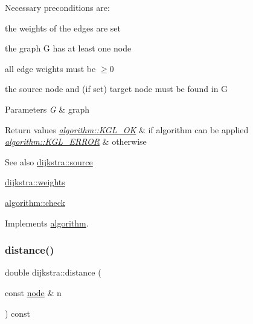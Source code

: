 Necessary preconditions are\+:
\begin{DoxyItemize}
\item the weights of the edges are set
\item the graph {\ttfamily G} has at least one node
\item all edge weights must be $\ge 0$
\item the source node and (if set) target node must be found in {\ttfamily G} 
\end{DoxyItemize}


\begin{DoxyParams}{Parameters}
{\em G} & graph\\
\hline
\end{DoxyParams}

\begin{DoxyRetVals}{Return values}
{\em \mbox{\hyperlink{classalgorithm_af1a0078e153aa99c24f9bdf0d97f6710aae4c1cd7fe8d8cf4b143241a6e7c31cf}{algorithm\+::\+K\+G\+L\+\_\+\+OK}}} & if algorithm can be applied \\
\hline
{\em \mbox{\hyperlink{classalgorithm_af1a0078e153aa99c24f9bdf0d97f6710ae67bf27b2ef31f73e545a7f9f4a69556}{algorithm\+::\+K\+G\+L\+\_\+\+E\+R\+R\+OR}}} & otherwise\\
\hline
\end{DoxyRetVals}
\begin{DoxySeeAlso}{See also}
\mbox{\hyperlink{classdijkstra_a9689f2628f76ddb3747ea18c91bd7041}{dijkstra\+::source}} 

\mbox{\hyperlink{classdijkstra_a92f4394b757f6ffcb372535114a6cbf6}{dijkstra\+::weights}} 

\mbox{\hyperlink{classalgorithm_a05c0f25463eb35a77b2d73fc06bb2c0e}{algorithm\+::check}} 
\end{DoxySeeAlso}


Implements \mbox{\hyperlink{classalgorithm_a05c0f25463eb35a77b2d73fc06bb2c0e}{algorithm}}.

\mbox{\label{classdijkstra_ae350a266dd47091d7f620a7328619426}} 
\subsubsection{\texorpdfstring{distance()}{distance()}}
{\footnotesize\ttfamily double dijkstra\+::distance (\begin{DoxyParamCaption}\item[{const \mbox{\hyperlink{classnode}{node}} \&}]{n }\end{DoxyParamCaption}) const}



